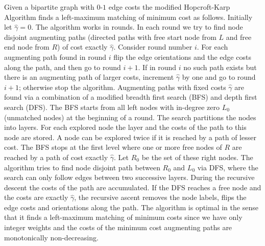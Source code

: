 \let\accentvec\vec \documentclass{llncs}
\newcommand{\mcost}{\hat{\gamma}}
\begin{document}
Given a bipartite graph with $0$-$1$ edge costs the modified Hopcroft-Karp Algorithm finds a left-maximum matching of minimum cost
as follows.
Initially let $\mcost=0$. The algorithm works in rounds. In each round we try to find node disjoint augmenting paths (directed paths with free start node from $L$ and free end node from $R$) of cost exactly $\mcost$. Consider round number $i$.
For each augmenting path found in round $i$ flip the edge orientations and the edge costs along the path, and then go to round $i+1$. If in  round $i$ no such path exists but there is an augmenting path of larger costs, increment $\mcost$ by one and go to round $i+1$; otherwise stop the algorithm. Augmenting paths with fixed costs $\mcost$ are found via a combination of a modified breadth first search (BFS) and depth first search (DFS). 
The BFS starts from all left nodes with in-degree zero $L_0$ (unmatched nodes) at the beginning of a round.
The search partitions the nodes into layers. For each explored node the layer and the costs of the path to this node are stored.
A node can be explored twice if it is reached by a path of lesser cost. The BFS stops at the first level where one or more free nodes of $R$ are reached by a path of cost exactly $\mcost$. Let $R_0$ be the set of these right nodes. The algorithm tries to find node disjoint path between $R_0$ and $L_0$ via DFS, where the search can only follow edges between two successive layers.
During the recursive descent the costs of the path are accumulated. If the DFS reaches a free node and the costs are exactly $\mcost$,
the recursive ascent removes the node labels, flips the edge costs and orientations along the path.
The algorithm is optimal in the sense that it finds a left-maximum matching of minimum costs since we have only integer weights and the costs of the minimum cost augmenting paths are monotonically non-decreasing.
\end{document}
